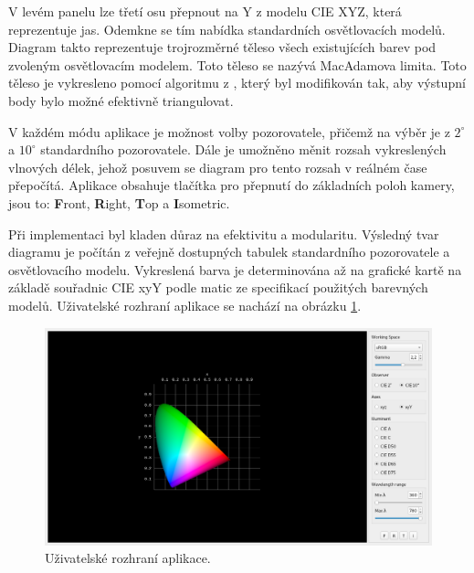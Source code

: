 \documentclass[a4paper, 12pt, titlepage]{article}
\begin{document}
  V levém panelu lze třetí osu přepnout na Y z modelu CIE XYZ, která reprezentuje jas.
  Odemkne se tím nabídka standardních osvětlovacích modelů.
  Diagram takto reprezentuje trojrozměrné těleso všech existujících barev pod zvoleným osvětlovacím modelem.
  Toto těleso se nazývá MacAdamova limita.
  Toto těleso je vykresleno pomocí algoritmu z \cite{Perales2005}, který byl modifikován tak, aby výstupní body bylo možné efektivně triangulovat.

  V každém módu aplikace je možnost volby pozorovatele, přičemž na výběr je z $2^\circ$ a $10^\circ$ standardního pozorovatele.
  Dále je umožněno měnit rozsah vykreslených vlnových délek, jehož posuvem se diagram pro tento rozsah v reálném čase přepočítá.
  Aplikace obsahuje tlačítka pro přepnutí do základních poloh kamery, jsou to: \textbf{F}ront, \textbf{R}ight, \textbf{T}op a \textbf{I}sometric.

  Při implementaci byl kladen důraz na efektivitu a modularitu.
  Výsledný tvar diagramu je počítán z veřejně dostupných tabulek standardního pozorovatele a osvětlovacího modelu.
  Vykreslená barva je determinována až na grafické kartě na základě souřadnic CIE xyY podle matic ze specifikací použitých barevných modelů.
  Uživatelské rozhraní aplikace se nachází na obrázku \ref{fig:app}.

	\begin{figure}[h!]
	\centering
	\includegraphics[width=15cm]{app.png}
	\caption{Uživatelské rozhraní aplikace.}
	\label{fig:app}
	\end{figure}

  \newpage

  
  
\end{document}
